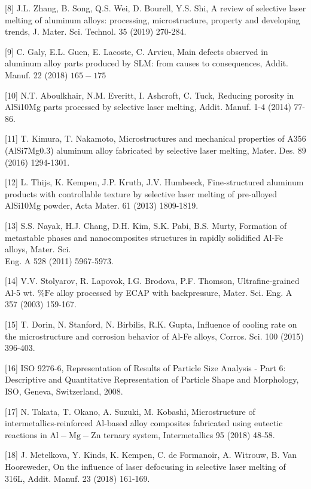 \documentclass[10pt]{article}
\begin{document}
[8] J.L. Zhang, B. Song, Q.S. Wei, D. Bourell, Y.S. Shi, A review of selective laser melting of aluminum alloys: processing, microstructure, property and developing trends, J. Mater. Sci. Technol. 35 (2019) 270-284.

[9] C. Galy, E.L. Guen, E. Lacoste, C. Arvieu, Main defects observed in aluminum alloy parts produced by SLM: from causes to consequences, Addit. Manuf. 22 (2018) $165-175$

[10] N.T. Aboulkhair, N.M. Everitt, I. Ashcroft, C. Tuck, Reducing porosity in AlSi10Mg parts processed by selective laser melting, Addit. Manuf. 1-4 (2014) 77-86.

[11] T. Kimura, T. Nakamoto, Microstructures and mechanical properties of A356 (AlSi7Mg0.3) aluminum alloy fabricated by selective laser melting, Mater. Des. 89 (2016) 1294-1301.

[12] L. Thijs, K. Kempen, J.P. Kruth, J.V. Humbeeck, Fine-structured aluminum products with controllable texture by selective laser melting of pre-alloyed AlSi10Mg powder, Acta Mater. 61 (2013) 1809-1819.

[13] S.S. Nayak, H.J. Chang, D.H. Kim, S.K. Pabi, B.S. Murty, Formation of metastable phases and nanocomposites structures in rapidly solidified Al-Fe alloys, Mater. Sci.\\
Eng. A 528 (2011) 5967-5973.

[14] V.V. Stolyarov, R. Lapovok, I.G. Brodova, P.F. Thomson, Ultrafine-grained Al-5 wt. $\% \mathrm{Fe}$ alloy processed by ECAP with backpressure, Mater. Sci. Eng. A 357 (2003) 159-167.

[15] T. Dorin, N. Stanford, N. Birbilis, R.K. Gupta, Influence of cooling rate on the microstructure and corrosion behavior of Al-Fe alloys, Corros. Sci. 100 (2015) 396-403.

[16] ISO 9276-6, Representation of Results of Particle Size Analysis - Part 6: Descriptive and Quantitative Representation of Particle Shape and Morphology, ISO, Geneva, Switzerland, 2008.

[17] N. Takata, T. Okano, A. Suzuki, M. Kobashi, Microstructure of intermetallics-reinforced Al-based alloy composites fabricated using eutectic reactions in $\mathrm{Al}-\mathrm{Mg}-\mathrm{Zn}$ ternary system, Intermetallics 95 (2018) 48-58.

[18] J. Metelkova, Y. Kinds, K. Kempen, C. de Formanoir, A. Witrouw, B. Van Hooreweder, On the influence of laser defocusing in selective laser melting of 316L, Addit. Manuf. 23 (2018) 161-169.
\end{document}
